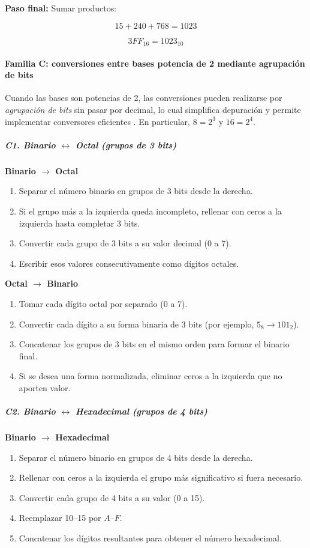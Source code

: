 \documentclass[12pt,twoside]{book}
\begin{document}
						\noindent
						\textbf{Paso final:} Sumar productos:
						
						\[
						15 + 240 + 768 = 1023
						\]
						
						\[
						3FF_{16} = 1023_{10}
						\]
						
						\paragraph{Familia C: conversiones entre bases potencia de 2 mediante agrupación de bits}
						Cuando las bases son potencias de 2, las conversiones pueden realizarse por \emph{agrupación de bits} sin pasar por decimal, lo cual simplifica depuración y permite implementar conversores eficientes \cite{Tanenbaum2021Structured,Sebesta2018Concepts,Wirth1976Algorithms}. En particular, $8=2^3$ y $16=2^4$.
						
						\subparagraph{C1. Binario $\leftrightarrow$ Octal (grupos de 3 bits)}
						\textbf{Binario $\rightarrow$ Octal}
						\begin{enumerate}
							\item Separar el número binario en grupos de 3 bits desde la derecha.
							\item Si el grupo más a la izquierda queda incompleto, rellenar con ceros a la izquierda hasta completar 3 bits.
							\item Convertir cada grupo de 3 bits a su valor decimal (0 a 7).
							\item Escribir esos valores consecutivamente como dígitos octales.
						\end{enumerate}
						
						\textbf{Octal $\rightarrow$ Binario}
						\begin{enumerate}
							\item Tomar cada dígito octal por separado (0 a 7).
							\item Convertir cada dígito a su forma binaria de 3 bits (por ejemplo, $5_8 \rightarrow 101_2$).
							\item Concatenar los grupos de 3 bits en el mismo orden para formar el binario final.
							\item Si se desea una forma normalizada, eliminar ceros a la izquierda que no aporten valor.
						\end{enumerate}
						
						\subparagraph{C2. Binario $\leftrightarrow$ Hexadecimal (grupos de 4 bits)}
						\textbf{Binario $\rightarrow$ Hexadecimal}
						\begin{enumerate}
							\item Separar el número binario en grupos de 4 bits desde la derecha.
							\item Rellenar con ceros a la izquierda el grupo más significativo si fuera necesario.
							\item Convertir cada grupo de 4 bits a su valor (0 a 15).
							\item Reemplazar 10--15 por $A$--$F$.
							\item Concatenar los dígitos resultantes para obtener el número hexadecimal.
						\end{enumerate}
						
\end{document}

